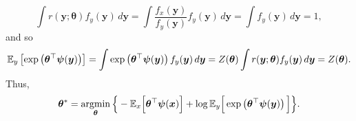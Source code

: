 \documentclass[11pt]{article}
\numberwithin{equation}{section}
\numberwithin{theorem}{section}
\def\fatx{\boldsymbol{x}}
\def\faty{\boldsymbol{y}}
\def\fattheta{\boldsymbol{\theta}}
\def\fatpsi{\boldsymbol{\psi}}
\theoremstyle{definition}
\theoremstyle{remark}
\begin{document}
\begin{equation}
\int r(\faty;\fattheta) f_y(\faty) \, d\faty
= \int \frac{f_x(\faty)}{f_y(\faty)} f_y(\faty) \, d\faty
= \int f_y(\faty) \, d\faty
= 1,
\end{equation}
and so
\begin{equation}
\EE_y\left[ \exp\left( \fattheta^\top \fatpsi(\faty) \right) \right]
= \int \exp\left( \fattheta^\top \fatpsi(\faty) \right) f_y(\faty) \, d\faty
= Z(\fattheta) \int r(\faty;\fattheta) f_y(\faty) \, d\faty
= Z(\fattheta).
\end{equation}
Thus,
\begin{equation} \label{eq:EKLIEP}
\fattheta^*
= \argmin_{\fattheta} \Big\{ -\EE_x\Big[ \fattheta^\top \fatpsi(\fatx) \Big] + \log \EE_y\Big[ \exp\left( \fattheta^\top \fatpsi(\faty) \right) \Big] \Big\}.
\end{equation}
\end{document}
